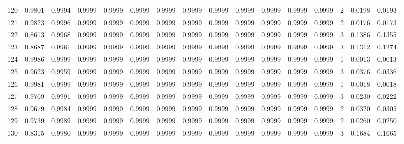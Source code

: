 \begin{tabular}{lrrrrrrrrrrrrrrr}
120 &      0.9801 &  0.9994 &  0.9999 &  0.9999 &  0.9999 &  0.9999 &  0.9999 &  0.9999 &  0.9999 &  0.9999 &   0.9999 &     0.9999 &      2 &                    0.0198 &                     0.0193 \\
121 &      0.9823 &  0.9996 &  0.9999 &  0.9999 &  0.9999 &  0.9999 &  0.9999 &  0.9999 &  0.9999 &  0.9999 &   0.9999 &     0.9999 &      2 &                    0.0176 &                     0.0173 \\
122 &      0.8613 &  0.9968 &  0.9999 &  0.9999 &  0.9999 &  0.9999 &  0.9999 &  0.9999 &  0.9999 &  0.9999 &   0.9999 &     0.9999 &      3 &                    0.1386 &                     0.1355 \\
123 &      0.8687 &  0.9961 &  0.9999 &  0.9999 &  0.9999 &  0.9999 &  0.9999 &  0.9999 &  0.9999 &  0.9999 &   0.9999 &     0.9999 &      3 &                    0.1312 &                     0.1274 \\
124 &      0.9986 &  0.9999 &  0.9999 &  0.9999 &  0.9999 &  0.9999 &  0.9999 &  0.9999 &  0.9999 &  0.9999 &   0.9999 &     0.9999 &      1 &                    0.0013 &                     0.0013 \\
125 &      0.9623 &  0.9959 &  0.9999 &  0.9999 &  0.9999 &  0.9999 &  0.9999 &  0.9999 &  0.9999 &  0.9999 &   0.9999 &     0.9999 &      3 &                    0.0376 &                     0.0336 \\
126 &      0.9981 &  0.9999 &  0.9999 &  0.9999 &  0.9999 &  0.9999 &  0.9999 &  0.9999 &  0.9999 &  0.9999 &   0.9999 &     0.9999 &      1 &                    0.0018 &                     0.0018 \\
127 &      0.9769 &  0.9991 &  0.9999 &  0.9999 &  0.9999 &  0.9999 &  0.9999 &  0.9999 &  0.9999 &  0.9999 &   0.9999 &     0.9999 &      3 &                    0.0230 &                     0.0222 \\
128 &      0.9679 &  0.9984 &  0.9999 &  0.9999 &  0.9999 &  0.9999 &  0.9999 &  0.9999 &  0.9999 &  0.9999 &   0.9999 &     0.9999 &      2 &                    0.0320 &                     0.0305 \\
129 &      0.9739 &  0.9989 &  0.9999 &  0.9999 &  0.9999 &  0.9999 &  0.9999 &  0.9999 &  0.9999 &  0.9999 &   0.9999 &     0.9999 &      2 &                    0.0260 &                     0.0250 \\
130 &      0.8315 &  0.9980 &  0.9999 &  0.9999 &  0.9999 &  0.9999 &  0.9999 &  0.9999 &  0.9999 &  0.9999 &   0.9999 &     0.9999 &      3 &                    0.1684 &                     0.1665 \\

\end{tabular}
